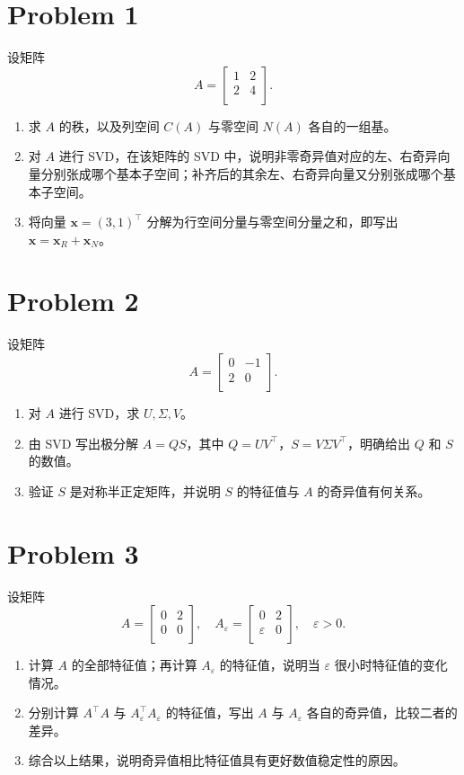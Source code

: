 \section*{Problem 1}

设矩阵
\[
A = \begin{bmatrix}
    1 & 2 \\
    2 & 4 \\
\end{bmatrix}.
\]
\begin{enumerate}
    \item 求 $A$ 的秩，以及列空间 $C \left(A\right)$ 与零空间 $N \left(A\right)$ 各自的一组基。
    \item 对 $A$ 进行 SVD，在该矩阵的 SVD 中，说明非零奇异值对应的左、右奇异向量分别张成哪个基本子空间；补齐后的其余左、右奇异向量又分别张成哪个基本子空间。
    \item 将向量 $\boldsymbol{x} = \left(3, 1\right)^\top$ 分解为行空间分量与零空间分量之和，即写出 $\boldsymbol{x} = \boldsymbol{x}_{R} + \boldsymbol{x}_{N}$。
\end{enumerate}

\section*{Problem 2}

设矩阵
\[
A =
\begin{bmatrix}
    0 & -1 \\
    2 & 0 \\
\end{bmatrix}.
\]
\begin{enumerate}
    \item 对 $A$ 进行 SVD，求 $U, \Sigma, V$。
    \item 由 SVD 写出极分解 $A = QS$，其中 $Q = UV^\top$，$S = V \Sigma V^\top$，明确给出 $Q$ 和 $S$ 的数值。
    \item 验证 $S$ 是对称半正定矩阵，并说明 $S$ 的特征值与 $A$ 的奇异值有何关系。
\end{enumerate}

\section*{Problem 3}

设矩阵
\[
A = \begin{bmatrix}
    0 & 2 \\
    0 & 0 \\
\end{bmatrix}, \quad A_\varepsilon = \begin{bmatrix}
    0 & 2 \\
    \varepsilon & 0 \\
\end{bmatrix}, \quad \varepsilon > 0.
\]
\begin{enumerate}
    \item 计算 $A$ 的全部特征值；再计算 $A_\varepsilon$ 的特征值，说明当 $\varepsilon$ 很小时特征值的变化情况。
    \item 分别计算 $A^\top A$ 与 $A_\varepsilon^\top A_\varepsilon$ 的特征值，写出 $A$ 与 $A_\varepsilon$ 各自的奇异值，比较二者的差异。
    \item 综合以上结果，说明奇异值相比特征值具有更好数值稳定性的原因。
\end{enumerate}
